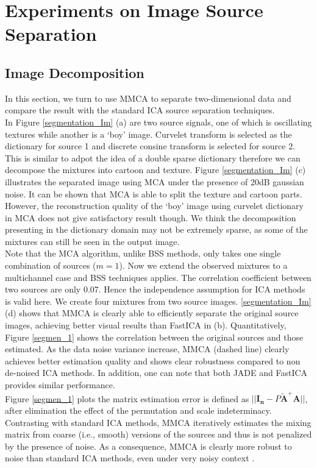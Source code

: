 \section{Experiments on Image Source Separation}

\subsection{Image Decomposition}
In this section, we turn to use MMCA to separate two-dimensional data and compare the result with the standard ICA source separation techniques. \\

In Figure \ref{segmentation_Im} (a) are two source signals, one of which is oscillating textures while another is  a `boy' image. Curvelet transform is selected as the dictionary for source 1 and discrete consine transform is selected for source 2. This is similar to adpot the idea of a double sparse dictionary therefore we can decompose the mixtures into cartoon and texture. Figure \ref{segmentation_Im} (c) illustrates the separated image using MCA under the presence of 20dB gaussian noise. It can be shown that MCA is able to split the texture and cartoon parts. However, the reconstruction quality of the `boy' image using curvelet dictionary in MCA does not give satisfactory result though. We think the decomposition presenting in the dictionary domain may not be extremely sparse, as some of the mixtures can still be seen in the output image. \\

Note that the MCA algorithm, unlike BSS methods, only takes one single combination of sources ($m = 1$). Now we extend the observed mixtures to a multichannel case and BSS techniques applies. The correlation coefficient between two sources are only 0.07. Hence the independence assumption for ICA methods is valid here. We create four mixtures from two source images.
\ref{segmentation_Im} (d) shows that MMCA is clearly able to efficiently separate the original source images, achieving better visual results than FastICA in (b). Quantitatively, Figure \ref{segmen_1} shows the correlation between the original sources and those estimated. As the data noise variance increase, 
MMCA (dashed line) clearly achieves better estimation quality and shows clear robustness compared to non de-noised ICA methods. In addition, one can note that both JADE and FastICA provides similar performance.\\

Figure \ref{segmen_1} plots the matrix estimation error is defined as $||\mathbf{I_n} - P\tilde{\mathbf{A}}^{+}\mathbf{A} ||$, after elimination the effect of the permutation and scale indeterminacy. Contrasting with standard ICA methods, MMCA iteratively estimates the mixing matrix from coarse (i.e., smooth) versions of the sources and thus is not penalized by the presence of noise. As a consequence, MMCA is clearly more robust to noise than standard ICA methods, even under very noisy context \cite{BobinJ_2006Mdas}.\\

